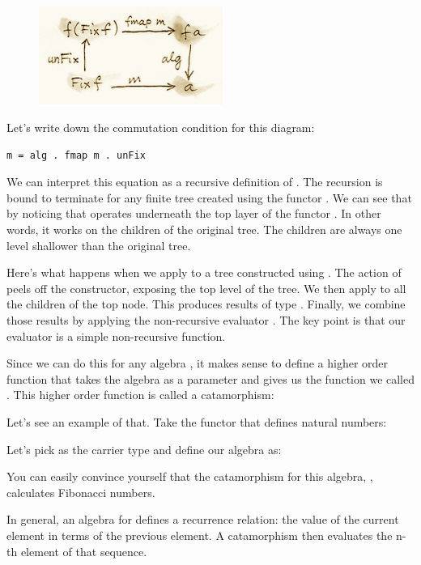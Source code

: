 \begin{figure}[H]
\centering
\includegraphics[width=60mm]{images/alg6.png}
\end{figure}

\noindent
Let's write down the commutation condition for this diagram:

\begin{Verbatim}
m = alg . fmap m . unFix
\end{Verbatim}
We can interpret this equation as a recursive definition of .
The recursion is bound to terminate for any finite tree created using
the functor . We can see that by noticing that
 operates underneath the top layer of the functor
. In other words, it works on the children of the original
tree. The children are always one level shallower than the original
tree.

Here's what happens when we apply  to a tree constructed using
. The action of  peels off the constructor,
exposing the top level of the tree. We then apply  to all the
children of the top node. This produces results of type .
Finally, we combine those results by applying the non-recursive
evaluator . The key point is that our evaluator 
is a simple non-recursive function.

Since we can do this for any algebra , it makes sense to
define a higher order function that takes the algebra as a parameter and
gives us the function we called . This higher order function
is called a catamorphism:

Let's see an example of that. Take the functor that defines natural
numbers:

Let's pick  as the carrier type and define our
algebra as:

You can easily convince yourself that the catamorphism for this algebra,
, calculates Fibonacci numbers.

In general, an algebra for  defines a recurrence relation:
the value of the current element in terms of the previous element. A
catamorphism then evaluates the n-th element of that sequence.

